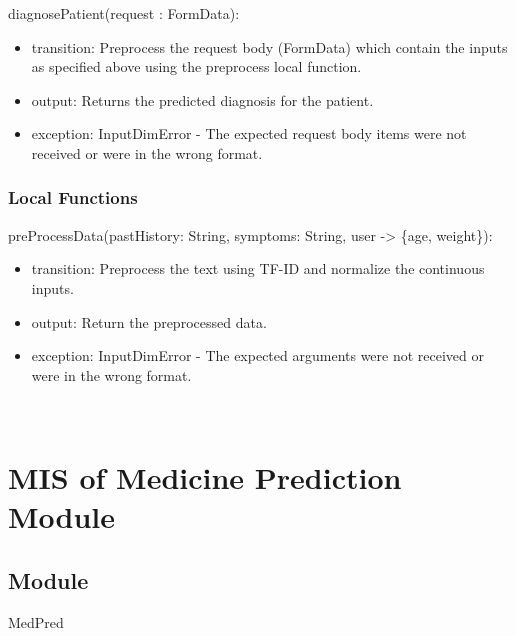 \documentclass[12pt, titlepage]{article}
\begin{document}
\noindent diagnosePatient(request : FormData):
\begin{itemize}
\item transition: Preprocess the request body (FormData) which contain the inputs as specified above using the preprocess local function. 
\item output: Returns the predicted diagnosis for the patient.
\item exception: InputDimError - The expected request body items were not received or were in the wrong format.
\end{itemize}


\subsubsection{Local Functions}


\noindent preProcessData(pastHistory: String, symptoms: String, user -> \{age, weight\}):
\begin{itemize}
\item transition: Preprocess the text using TF-ID and normalize the continuous inputs.
\item output: Return the preprocessed data.
\item exception: InputDimError - The expected arguments were not received or were in the wrong format.
\end{itemize}


\newpage
~\newpage
  
\section{MIS of Medicine Prediction Module} \label{med_pred_mod}


\subsection{Module}

MedPred
\end{document}

